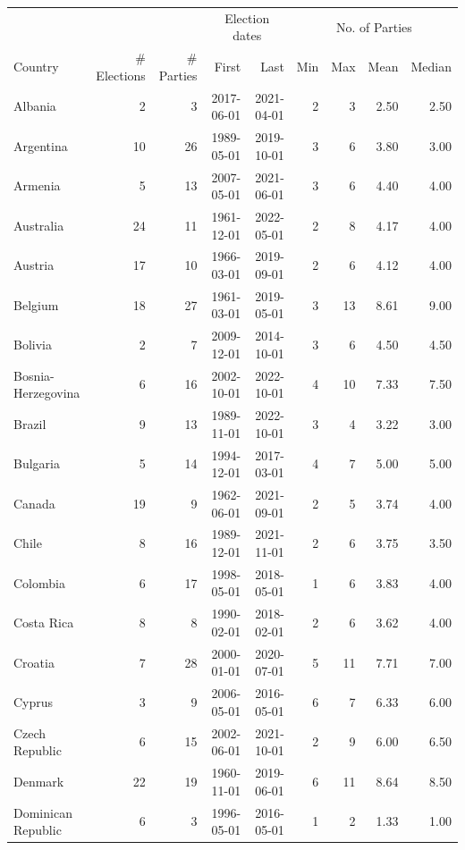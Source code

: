 {\footnotesize\setlength{\tabcolsep}{4pt}
\begin{longtable}{lrrrrrrrr}
  \toprule
  & & & \multicolumn{2}{c}{Election dates} & \multicolumn{4}{c}{No. of Parties}\\
Country & \# Elections & \# Parties & First & Last & Min & Max & Mean & Median \\
  \midrule
Albania & 2 & 3 & 2017-06-01 & 2021-04-01 & 2 & 3 & 2.50 & 2.50 \\
Argentina & 10 & 26 & 1989-05-01 & 2019-10-01 & 3 & 6 & 3.80 & 3.00 \\
Armenia & 5 & 13 & 2007-05-01 & 2021-06-01 & 3 & 6 & 4.40 & 4.00 \\
Australia & 24 & 11 & 1961-12-01 & 2022-05-01 & 2 & 8 & 4.17 & 4.00 \\
Austria & 17 & 10 & 1966-03-01 & 2019-09-01 & 2 & 6 & 4.12 & 4.00 \\
Belgium & 18 & 27 & 1961-03-01 & 2019-05-01 & 3 & 13 & 8.61 & 9.00 \\
Bolivia & 2 & 7 & 2009-12-01 & 2014-10-01 & 3 & 6 & 4.50 & 4.50 \\
Bosnia-Herzegovina & 6 & 16 & 2002-10-01 & 2022-10-01 & 4 & 10 & 7.33 & 7.50 \\
Brazil & 9 & 13 & 1989-11-01 & 2022-10-01 & 3 & 4 & 3.22 & 3.00 \\
Bulgaria & 5 & 14 & 1994-12-01 & 2017-03-01 & 4 & 7 & 5.00 & 5.00 \\
Canada & 19 & 9 & 1962-06-01 & 2021-09-01 & 2 & 5 & 3.74 & 4.00 \\
Chile & 8 & 16 & 1989-12-01 & 2021-11-01 & 2 & 6 & 3.75 & 3.50 \\
Colombia & 6 & 17 & 1998-05-01 & 2018-05-01 & 1 & 6 & 3.83 & 4.00 \\
Costa Rica & 8 & 8 & 1990-02-01 & 2018-02-01 & 2 & 6 & 3.62 & 4.00 \\
Croatia & 7 & 28 & 2000-01-01 & 2020-07-01 & 5 & 11 & 7.71 & 7.00 \\
Cyprus & 3 & 9 & 2006-05-01 & 2016-05-01 & 6 & 7 & 6.33 & 6.00 \\
Czech Republic & 6 & 15 & 2002-06-01 & 2021-10-01 & 2 & 9 & 6.00 & 6.50 \\
Denmark & 22 & 19 & 1960-11-01 & 2019-06-01 & 6 & 11 & 8.64 & 8.50 \\
Dominican Republic & 6 & 3 & 1996-05-01 & 2016-05-01 & 1 & 2 & 1.33 & 1.00 \\

\end{longtable}}
